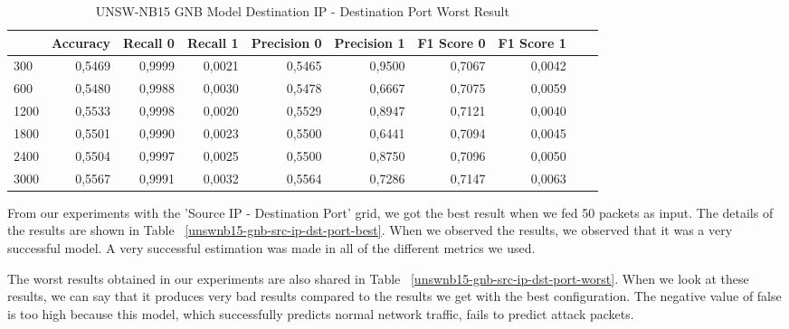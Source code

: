 \documentclass{article}
\begin{document}
\begin{table}
  \centering
  \caption{UNSW-NB15 GNB Model Destination IP - Destination Port Worst Result}
  \label{unswnb15-gnb-dst-ip-dst-port-worst}
  \begin{tabular}{lrrrrrrrrr}
    \toprule
	{ Pred Win & Accuracy & Recall 0 & Recall 1 & Precision 0 & Precision 1 & F1 Score 0 & F1 Score 1} \\
	\midrule
        300 & 0,5469 & 0,9999 & 0,0021 & 0,5465 & 0,9500 & 0,7067 & 0,0042 \\ \hline
        600 & 0,5480 & 0,9988 & 0,0030 & 0,5478 & 0,6667 & 0,7075 & 0,0059 \\ \hline
        1200 & 0,5533 & 0,9998 & 0,0020 & 0,5529 & 0,8947 & 0,7121 & 0,0040 \\ \hline
        1800 & 0,5501 & 0,9990 & 0,0023 & 0,5500 & 0,6441 & 0,7094 & 0,0045 \\ \hline
        2400 & 0,5504 & 0,9997 & 0,0025 & 0,5500 & 0,8750 & 0,7096 & 0,0050 \\ \hline
        3000 & 0,5567 & 0,9991 & 0,0032 & 0,5564 & 0,7286 & 0,7147 & 0,0063 \\ 
	\bottomrule
  \end{tabular}
\end{table}

From our experiments with the 'Source IP - Destination Port' grid, we got the best result when we fed 50 packets as input. The details of the results are shown in Table ~\ref{unswnb15-gnb-src-ip-dst-port-best}. When we observed the results, we observed that it was a very successful model. A very successful estimation was made in all of the different metrics we used.

The worst results obtained in our experiments are also shared in Table ~\ref{unswnb15-gnb-src-ip-dst-port-worst}. When we look at these results, we can say that it produces very bad results compared to the results we get with the best configuration. The negative value of false is too high because this model, which successfully predicts normal network traffic, fails to predict attack packets.
\end{document}
